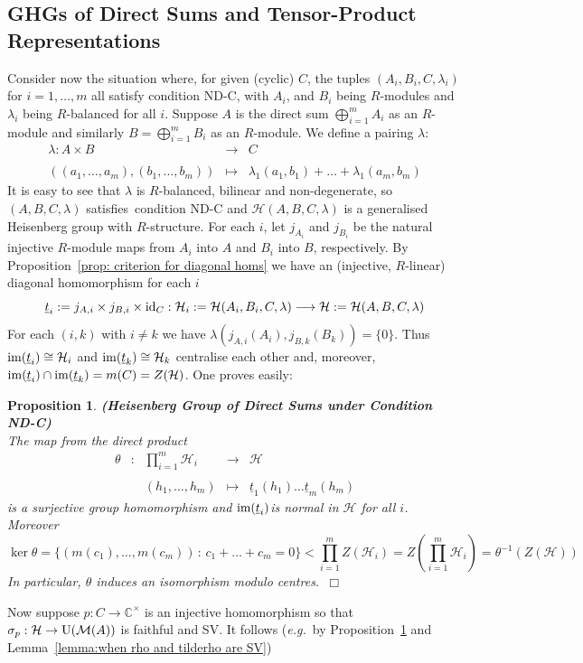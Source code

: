 \documentclass[12pt]{article}
\newtheorem{prop}{Proposition}[section]
\newcommand{\bbC}{\ensuremath{\mathbb{C}}}\newcommand{\bbCp}{\ensuremath{\mathbb{C}_p}}
\newcommand{\cH}{\ensuremath{\mathcal{H}}}
\newcommand{\cM}{\mathcal{M}}
\newcommand{\displaymapdef}[5]
{
	\begin{array}{rcrcl}
		#1 &:& #2 &\longrightarrow& #3 \\
		& &    &                    \\
		& & #4 &\longmapsto    & #5
	\end{array}
}
\newcommand{\displaynomapdef}[4]
{
	\begin{array}{ccc}
		#1 &\longrightarrow& #2 \\
		&                    \\
		#3 &\longmapsto    & #4
	\end{array}
}
\newcommand{\eg}{\emph{e.g.}}
\newcommand{\ePf}{~$\Box$\vertsp\par}%
\newcommand{\id}{{\rm id}}
\newcommand{\im}{{\rm im}}
\newcommand{\inv}{^{-1}}%
\newcommand{\U}{{\rm U}}
\newcommand{\ut}{\underline{t}}
\newcommand{\vertsp}{\vspace{1ex}}
\newcommand{\Hei}[4]{\cH({#1},{#2},{#3},{#4})}
\newcommand{\HeiStan}{\Hei{A}{B}{C}{\lambda}}
\begin{document}
\subsection{GHGs of Direct Sums and Tensor-Product Representations}
Consider now the situation where, for given (cyclic) $C$,  the tuples $(A_i,B_i,C,\lambda_i)$ for $i=1,\ldots,m$  all satisfy condition ND-C, with $A_i$, and $B_i$ being $R$-modules and $\lambda_i$ being $R$-balanced for all $i$. Suppose $A$ is the direct sum $\bigoplus_{i=1}^m A_i$ as an $R$-module and similarly 
$B=\bigoplus_{i=1}^m B_i$ as an $R$-module. We define a pairing $\lambda$: 
$$
\displaynomapdef
{\lambda:A\times B}
{C}
{((a_1,\ldots,a_m),(b_1,\ldots,b_m))}
{\lambda_1(a_1,b_1)+\ldots+\lambda_1(a_m,b_m)}
$$ 
It is easy to see that $\lambda$ is $R$-balanced, bilinear and non-degenerate, so $(A,B,C,\lambda)$ satisfies~condition ND-C and $\HeiStan$ is a generalised Heisenberg group with $R$-structure. 
For each $i$, let 
$j_{A_i}$ 
and $j_{B_i}$ be the natural
injective $R$-module maps from $A_i$ into $A$ and
$B_i$ into $B$, respectively. By 
Proposition~\ref{prop: criterion for diagonal homs} we have an (injective, $R$-linear) diagonal homomorphism for each $i$
$$
\ut_i:=j_{A,i}\times j_{B,i}\times \id_C : \cH_i:=\cH(A_i,B_i,C,\lambda)
\longrightarrow \cH:=\HeiStan
$$
For each $(i,k)$ with $i\neq k$ we have $\lambda(j_{A,i}(A_i),j_{B,k}(B_k))=\{0\}$. Thus  $\im(\ut_i)\cong\cH_i$ and $\im(\ut_k)\cong\cH_k$ centralise each other and, moreover,   
$\im(\ut_i)\cap\im(\ut_k)=m(C)=Z(\cH)$. One proves easily:
\begin{prop}\label{prop:direct product of Hei}{\bf (Heisenberg Group of Direct Sums under Condition ND-C)}\ \\
	The map from the direct product 
	$$
	\displaymapdef{\theta}{\prod_{i=1}^m\cH_i}{\cH}{(h_1,\ldots,h_m)}{\ut_1(h_1)\ldots\ut_m(h_m)}
	$$
	is a surjective group homomorphism and $\im(\ut_i)$is normal in $\cH$  for all $i$. Moreover 
$$
\ker\theta=\{(m(c_1),\ldots,m(c_m))\,:\, c_1+\ldots+c_m=0\}<
\prod_{i=1}^m Z(\cH_i)=Z\left(\prod_{i=1}^m\cH_i\right)
=\theta\inv(Z(\cH))
$$ 
%	
In particular, $\theta$ induces an isomorphism modulo centres.\ePf  
\end{prop}
Now suppose $p:C\rightarrow \bbC^\times$ is an injective homomorphism so that  $\sigma_p:\cH\rightarrow\U(\cM(A))$ is  faithful and SV. It follows (\eg\ by Proposition~\ref{prop:direct product of Hei} and Lemma~\ref{lemma:when rho and tilderho are SV}) 
\end{document}
